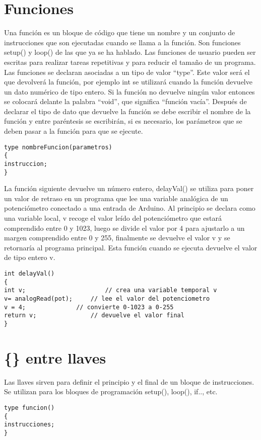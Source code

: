 \section{Funciones}
Una función es un bloque de código que tiene un nombre y un conjunto de instrucciones que son ejecutadas cuando se llama a la función. Son funciones setup() y loop() de las que ya se ha hablado. Las funciones de usuario pueden ser escritas para realizar tareas repetitivas y para reducir el tamaño de un programa. Las funciones se declaran asociadas a un tipo de valor “type”. Este valor será el que devolverá la función, por ejemplo int se utilizará cuando la función devuelve un dato numérico de tipo entero. Si la función no devuelve ningún valor entonces se colocará delante la palabra “void”, que significa “función vacía”. Después de declarar el tipo de dato que devuelve la función se debe escribir el nombre de la función y entre paréntesis se escribirán, si es necesario, los parámetros que se deben pasar a la función para que se ejecute.
\begin{lstlisting}
type nombreFuncion(parametros)
{
instruccion;
}
\end{lstlisting}
La función siguiente devuelve un número entero, delayVal() se utiliza para poner un valor de retraso en un programa que lee una variable analógica de un potenciómetro conectado a una entrada de Arduino. Al principio se declara como una variable local, v recoge el valor leído del potenciómetro que estará comprendido entre 0 y 1023, luego se divide el valor por 4 para ajustarlo a un margen comprendido entre 0 y 255, finalmente se devuelve el valor v y se retornaría al programa principal. Esta función cuando se ejecuta devuelve el valor de tipo entero v.
\begin{lstlisting}
int delayVal()
{
int v;                  	// crea una variable temporal v
v= analogRead(pot);  	// lee el valor del potenciometro
v = 4;            	// convierte 0-1023 a 0-255
return v;            	// devuelve el valor final
}
\end{lstlisting}
\section{\{\} entre llaves}
Las llaves sirven para definir el principio y el final de un bloque de instrucciones. Se utilizan para los bloques de programación setup(), loop(), if.., etc.
\begin{lstlisting}
type funcion()
{
instrucciones;
}
\end{lstlisting}

